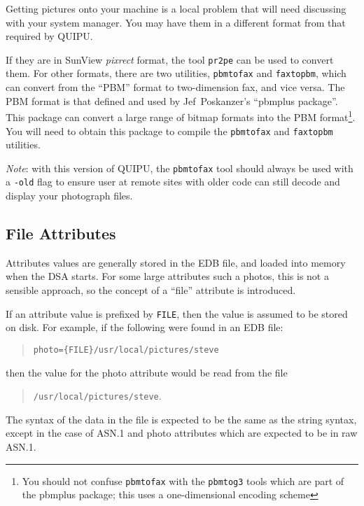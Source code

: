 Getting pictures onto your machine is a local problem that will need
discussing with your system manager.  You may have them in a different
format from that required by QUIPU.

If they are in SunView {\em pixrect} format, the tool \verb+pr2pe+ can be used
to convert them.
For other formats, there are two utilities, \verb+pbmtofax+ and \verb+faxtopbm+,
which can convert from the ``PBM'' format to two-dimension
fax, and vice versa.
The PBM format is that defined and used by 
Jef~Poskanzer's ``pbmplus package''.  This package
can convert a large range of bitmap formats into the PBM 
format\footnote{You should not confuse \verb+pbmtofax+ with the \verb+pbmtog3+
tools which are part of the pbmplus package; this uses a
one-dimensional encoding scheme}.
You will need to obtain this package to compile the \verb+pbmtofax+ 
and \verb+faxtopbm+ utilities.

{\em Note}: with this version of QUIPU, the \verb+pbmtofax+ tool should always be
used with a \verb+-old+ flag to ensure user at remote sites with 
older code can still decode and display your photograph files.

\subsection {File Attributes}
\label{file_attr}
Attributes values are generally stored in the EDB file, and loaded 
into memory when the DSA starts.
For some large attributes such a photos, this is not a sensible approach, so the
concept of a ``file'' attribute is introduced.

If an attribute value is prefixed by \verb"FILE", then the value is assumed
to be stored on disk.
For example, if the following were found in an EDB file:
\begin{quote}\small\begin{verbatim}
photo={FILE}/usr/local/pictures/steve
\end{verbatim}\end{quote}
then the value for the photo attribute would be read from the file
\begin{quote}
\verb"/usr/local/pictures/steve".
\end{quote}

The syntax of the data in the file is expected to be the same as
the string syntax, except in the case of ASN.1 and photo attributes which
are expected to be in raw ASN.1.

